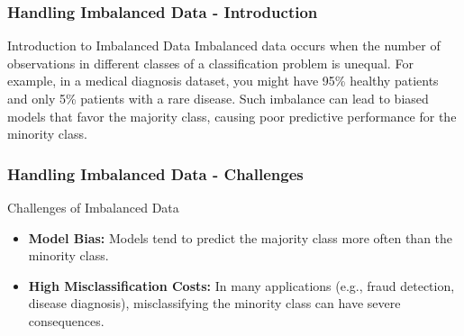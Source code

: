 \documentclass[aspectratio=169]{beamer}
\begin{document}
\begin{frame}[fragile]
    \frametitle{Handling Imbalanced Data - Introduction}
    \begin{block}{Introduction to Imbalanced Data}
        Imbalanced data occurs when the number of observations in different classes of a classification problem is unequal. 
        For example, in a medical diagnosis dataset, you might have 95\% healthy patients and only 5\% patients with a rare disease. 
        Such imbalance can lead to biased models that favor the majority class, causing poor predictive performance for the minority class.
    \end{block}
\end{frame}

\begin{frame}[fragile]
    \frametitle{Handling Imbalanced Data - Challenges}
    \begin{block}{Challenges of Imbalanced Data}
        \begin{itemize}
            \item \textbf{Model Bias:} Models tend to predict the majority class more often than the minority class.
            \item \textbf{High Misclassification Costs:} In many applications (e.g., fraud detection, disease diagnosis), 
            misclassifying the minority class can have severe consequences.
        \end{itemize}
    \end{block}
\end{frame}
\end{document}
